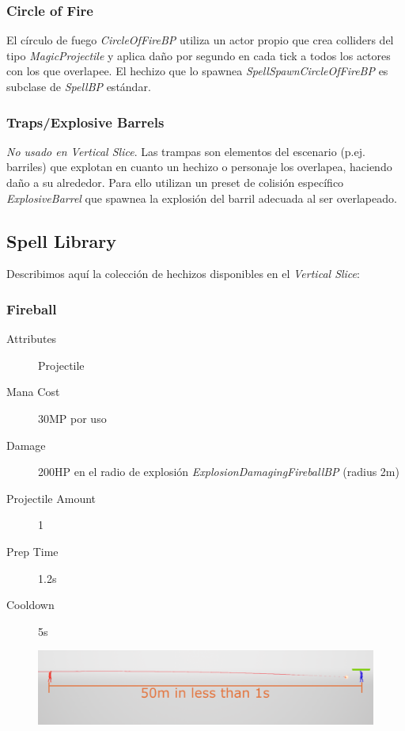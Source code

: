 \documentclass[12pt]{report}
\begin{document}
\subsubsection{Circle of Fire}

El círculo de fuego \textit{CircleOfFireBP} utiliza un actor propio que crea colliders del tipo \textit{MagicProjectile} y aplica daño por segundo en cada tick a todos los actores con los que overlapee. El hechizo que lo spawnea \textit{SpellSpawnCircleOfFireBP} es subclase de \textit{SpellBP} estándar.

\subsubsection{Traps/Explosive Barrels}

\textit{No usado en Vertical Slice}. Las trampas son elementos del escenario (p.ej. barriles) que explotan en cuanto un hechizo o personaje los overlapea, haciendo daño a su alrededor. Para ello utilizan un preset de colisión específico \textit{ExplosiveBarrel} que spawnea la explosión del barril adecuada al ser overlapeado.

\subsection{Spell Library}

Describimos aquí la colección de hechizos disponibles en el \textit{Vertical Slice}:

\subsubsection{Fireball}

\begin{description}
	\item[Attributes] Projectile
	\item[Mana Cost] 30MP por uso
	\item[Damage] 200HP en el radio de explosión \textit{ExplosionDamagingFireballBP} (radius 2m)
	\item[Projectile Amount] 1
	\item[Prep Time] 1.2s
	\item[Cooldown] 5s
\end{description}

\begin{figure}[H]
    \centering
    \includegraphics[width=1\textwidth]{fireball_trajectory}
\end{figure}
\end{document}
